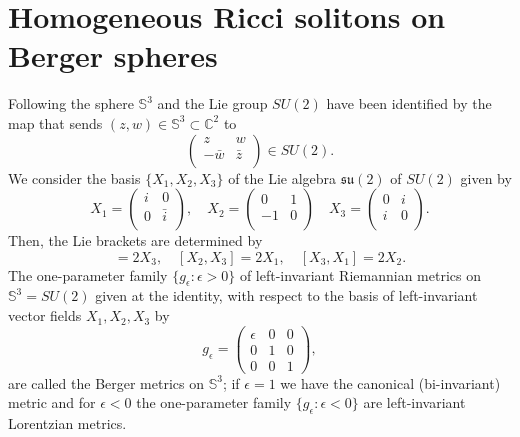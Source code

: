\documentclass[11pt,oneside,leqno]{amsart}
\theoremstyle{plain}
\begin{document}
\section{Homogeneous Ricci solitons on Berger spheres}
Following \cite{g1} the sphere ${{\mathbb S}}^3$ and the Lie group $SU(2)$ have been identified by the map that sends
$(z,w) \in {{\mathbb S}}^3 \subset {{\mathbb C}}^2$ to
$$
 \left( \begin{array}{cc}
   z & w   \\
   -\bar{w} & \bar{z}   \\
   \end{array}  \right)  \in SU(2).
 $$
We consider the basis $\lbrace X_1,X_2,X_3 \rbrace$ of the Lie
algebra ${{\mathfrak{su}}}(2)$ of $SU(2)$ given by 
\begin{equation}
 X_1=\left( \begin{array}{cc}
   i & 0   \\
   0 & \bar{i}   \\
   \end{array}  \right), \quad
   X_2=\left( \begin{array}{cc}
   0 & 1   \\
   -1 & 0   \\
   \end{array}  \right) \quad
   X_3=\left( \begin{array}{cc}
   0 & i   \\
   i & 0   \\
   \end{array}  \right).
 \end{equation}
Then, the Lie brackets are determined by
\begin{equation}
 [X_1,X_2]=2X_3,\quad [X_2,X_3]=2X_1,\quad  [X_3,X_1]=2X_2.
 \end{equation}
The one-parameter family $\lbrace g_{\epsilon} : \epsilon>0\rbrace$ of left-invariant Riemannian metrics on ${{\mathbb S}}^3 =
SU(2)$ given at the identity, with respect to the basis of left-invariant vector fields
$ X_1,X_2,X_3 $ by
\begin{equation}\label{meter}
g_{\epsilon}= \left( \begin{array}{ccc}
   \epsilon & 0 & 0   \\
   0 & 1 & 0   \\
   0 & 0 & 1  
   \end{array}  \right),
\end{equation}
are called the Berger metrics on ${{\mathbb S}}^3$; if $\epsilon=1$ we have the canonical (bi-invariant) metric and for $\epsilon<0$ the one-parameter family $\lbrace g_{\epsilon} : \epsilon<0\rbrace$ are left-invariant Lorentzian metrics.
\end{document}
